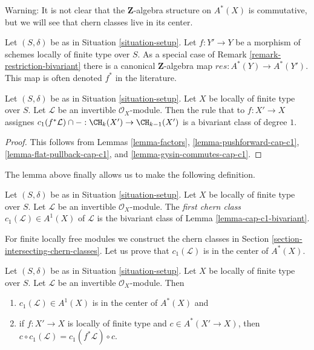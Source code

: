 \noindent
Warning: It is not clear that the $\mathbf{Z}$-algebra structure
on $A^*(X)$ is commutative, but we will see that chern classes live
in its center.

\begin{remark}
\label{remark-pullback-cohomology}
Let $(S, \delta)$ be as in Situation \ref{situation-setup}.
Let $f : Y' \to Y$ be a morphism of schemes locally of finite type over $S$.
As a special case of Remark \ref{remark-restriction-bivariant}
there is a canonical $\mathbf{Z}$-algebra map $res : A^*(Y) \to A^*(Y')$.
This map is often denoted $f^*$ in the literature.
\end{remark}

\begin{lemma}
\label{lemma-cap-c1-bivariant}
Let $(S, \delta)$ be as in Situation \ref{situation-setup}.
Let $X$ be locally of finite type over $S$.
Let $\mathcal{L}$ be an invertible $\mathcal{O}_X$-module.
Then the rule that to $f : X' \to X$ assignes
$c_1(f^*\mathcal{L}) \cap - : \CH_k(X') \to \CH_{k - 1}(X')$
is a bivariant class of degree $1$.
\end{lemma}

\begin{proof}
This follows from Lemmas \ref{lemma-factors},
\ref{lemma-pushforward-cap-c1},
\ref{lemma-flat-pullback-cap-c1}, and
\ref{lemma-gysin-commutes-cap-c1}.
\end{proof}

\noindent
The lemma above finally allows us to make the following definition.

\begin{definition}
\label{definition-first-chern-class}
Let $(S, \delta)$ be as in Situation \ref{situation-setup}. Let $X$
be locally of finite type over $S$. Let $\mathcal{L}$ be an invertible
$\mathcal{O}_X$-module. The {\it first chern class}
$c_1(\mathcal{L}) \in A^1(X)$ of $\mathcal{L}$
is the bivariant class of Lemma \ref{lemma-cap-c1-bivariant}.
\end{definition}

\noindent
For finite locally free modules we construct the chern classes in
Section \ref{section-intersecting-chern-classes}.
Let us prove that $c_1(\mathcal{L})$ is in the center of $A^*(X)$.

\begin{lemma}
\label{lemma-c1-center}
Let $(S, \delta)$ be as in Situation \ref{situation-setup}.
Let $X$ be locally of finite type over $S$.
Let $\mathcal{L}$ be an invertible $\mathcal{O}_X$-module.
Then
\begin{enumerate}
\item $c_1(\mathcal{L}) \in A^1(X)$ is in the center of $A^*(X)$ and
\item if $f : X' \to X$ is locally of finite type and $c \in A^*(X' \to X)$,
then $c \circ c_1(\mathcal{L}) = c_1(f^*\mathcal{L}) \circ c$.
\end{enumerate}
\end{lemma}

